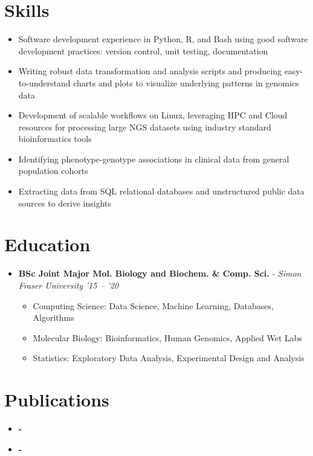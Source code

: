 \documentclass{article}
\newcommand{\experienceheader}[3]{\item \textbf{#1} - \textit{#2} \hfill \textit{#3} \vspace{-.2em}}
\newcommand{\customsection}[1]{\section*{#1} \vspace{-1em} \hrulefill \vspace{-.5em}}
\begin{document}

\customsection{Skills}
\begin{itemize}
  \item Software development experience in Python, R, and Bash using good software development practices: version control, unit testing, documentation 
  \item Writing robust data transformation and analysis scripts and producing easy-to-understand charts and plots to visualize underlying patterns in genomics data
  \item Development of scalable workflows on Linux, leveraging HPC and Cloud resources for processing large NGS datasets using industry standard bioinformatics tools
  \item Identifying phenotype-genotype associations in clinical data from general population cohorts
  \item Extracting data from SQL relational databases and unstructured public data sources to derive insights
\end{itemize}


\customsection{Education}
\begin{itemize}
\experienceheader{BSc Joint Major Mol. Biology and Biochem. \& Comp. Sci.}{Simon Fraser University}{'15 -- '20}
  \begin{itemize}
    \item Computing Science: Data Science, Machine Learning, Databases, Algorithms
    \item Molecular Biology: Bioinformatics, Human Genomics, Applied Wet Labs
    \item Statistics: Exploratory Data Analysis, Experimental Design and Analysis
  \end{itemize}
\end{itemize}



\customsection{Publications}
\begin{itemize}
  \item \textbf{-} 
  \item \textbf{-} 
\end{itemize}
\end{document}
